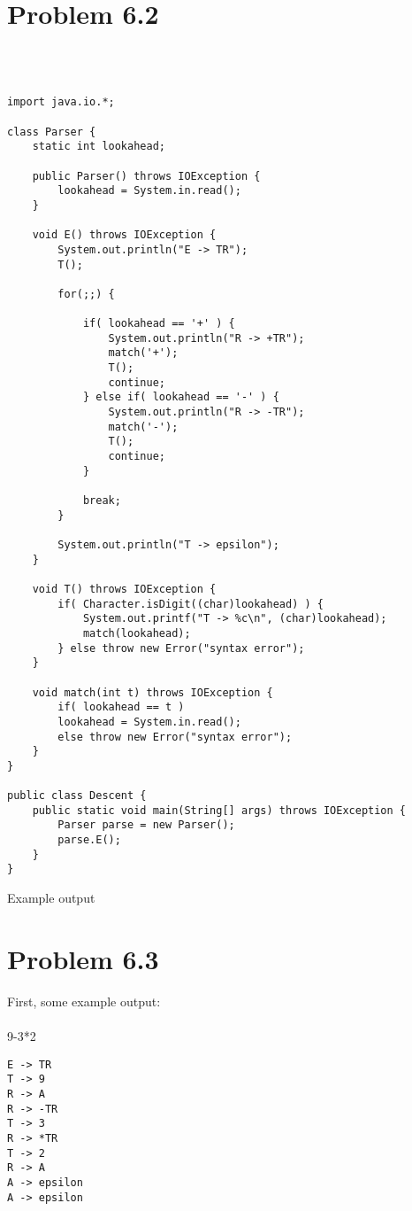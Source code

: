 \documentclass{article}%
\begin{document}
\section*{Problem 6.2}
\hline\\
\\
\begin{lstlisting}
import java.io.*;

class Parser {
    static int lookahead;

    public Parser() throws IOException {
        lookahead = System.in.read();
    }

    void E() throws IOException {
        System.out.println("E -> TR");
        T();

        for(;;) {

            if( lookahead == '+' ) {
                System.out.println("R -> +TR");
                match('+');
                T();
                continue;
            } else if( lookahead == '-' ) {
                System.out.println("R -> -TR");
                match('-');
                T();
                continue;
            }

            break;
        }

        System.out.println("T -> epsilon");
    }

    void T() throws IOException {
        if( Character.isDigit((char)lookahead) ) {
            System.out.printf("T -> %c\n", (char)lookahead);
            match(lookahead);
        } else throw new Error("syntax error");
    }

    void match(int t) throws IOException {
        if( lookahead == t )
        lookahead = System.in.read();
        else throw new Error("syntax error");
    }
}

public class Descent {
    public static void main(String[] args) throws IOException {
        Parser parse = new Parser();
        parse.E();
    }
}
\end{lstlisting}
Example output
\\

\section*{Problem 6.3}

First, some example output:\\
\\
9-3*2
\begin{verbatim}
E -> TR
T -> 9
R -> A
R -> -TR
T -> 3
R -> *TR
T -> 2
R -> A
A -> epsilon
A -> epsilon
\end{verbatim}
\end{document}

